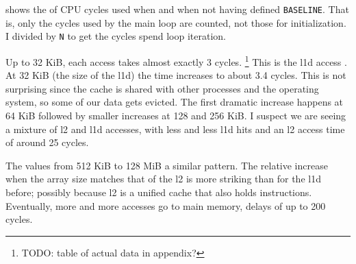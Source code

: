 

%
\begin{center} %
   \inputminted[firstline=12]{c}{access-times/access-times.c}
   \label{lst:access-times}
\end{center}


 shows the  of CPU cycles used when and
when not having defined \texttt{BASELINE}.  That is, only the cycles used by the
main loop are counted, not those for initialization.
I divided by \texttt{N} to get the cycles spend  loop
iteration.

Up to 32 KiB, each access takes almost exactly 3 cycles.%
\footnote{TODO: table of actual data in appendix?}
This is the \gls{l1d} access .  At 32 KiB (the size of the \gls{l1d})
the time increases to about 3.4 cycles.  This is not surprising since the cache is shared
with other processes and the operating system, so some of our data gets evicted.  The
first dramatic increase happens at 64 KiB followed by smaller increases at 128 and 256
KiB.  I suspect we are seeing a mixture of \gls{l2} and \gls{l1d} accesses, with less and
less \gls{l1d} hits and an \gls{l2} access time of around 25 cycles.

The values from 512 KiB to 128 MiB  a similar pattern.  The relative
increase when the array size matches that of the \gls{l2} is more striking than for the
\gls{l1d} before; possibly because \gls{l2} is a unified cache that also holds
instructions.  Eventually, more and more accesses go to main memory,  delays of up to 200 cycles.

